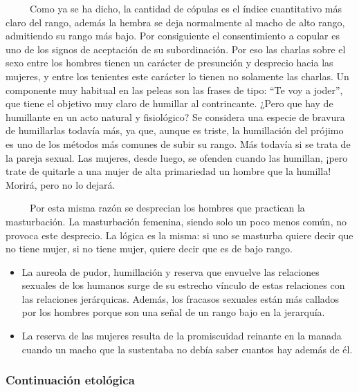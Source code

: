 ~ ~ ~ Como ya se ha dicho, la cantidad de cópulas es el índice
cuantitativo más claro del rango, además la hembra se deja normalmente
al macho de alto rango, admitiendo su rango más bajo. Por consiguiente
el consentimiento a copular es uno de los signos de aceptación de su
subordinación. Por eso las charlas sobre el sexo entre los hombres
tienen un carácter de presunción y desprecio hacia las mujeres, y entre
los tenientes este carácter lo tienen no solamente las charlas. Un
componente muy habitual en las peleas son las frases de tipo: ``Te voy a
joder'', que tiene el objetivo muy claro de humillar al contrincante.
¿Pero que hay de humillante en un acto natural y fisiológico? Se
considera una especie de bravura de humillarlas todavía más, ya que,
aunque es triste, la humillación del prójimo es uno de los métodos más
comunes de subir su rango. Más todavía si se trata de la pareja sexual.
Las mujeres, desde luego, se ofenden cuando las humillan, ¡pero trate de
quitarle a una mujer de alta primariedad un hombre que la humilla!
Morirá, pero no lo dejará.

~ ~ ~ Por esta misma razón se desprecian los hombres que practican la
masturbación. La masturbación femenina, siendo solo un poco menos común,
no provoca este desprecio. La lógica es la misma: si uno se masturba
quiere decir que no tiene mujer, si no tiene mujer, quiere decir que es
de bajo rango.

\begin{itemize}

\item
  La aureola de pudor, humillación y reserva que envuelve las relaciones
  sexuales de los humanos surge de su estrecho vínculo de estas
  relaciones con las relaciones jerárquicas. Además, los fracasos
  sexuales están más callados por los hombres porque son una señal de un
  rango bajo en la jerarquía.
\item
  La reserva de las mujeres resulta de la promiscuidad reinante en la
  manada cuando un macho que la sustentaba no debía saber cuantos hay
  además de él.
\end{itemize}

\hypertarget{continuaciuxf3n-etoluxf3gica}{\subsubsection{Continuación etológica}\label{continuaciuxf3n-etoluxf3gica}}

\protect\hypertarget{M19B}{}{}

